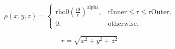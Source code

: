\documentclass[a4paper,14pt]{extarticle}
\begin{document}
\begin{equation*}
\rho(\mathit{x},\mathit{y},\mathit{z}) = \begin{cases}
               \mathrm{rho0} \left(\frac{\mathrm{r0}}{r}\right)^\mathrm{alpha},       &  \mathrm{rInner} \le \mathrm{r} \le  \mathrm{rOuter}, \\
               0,& \text{otherwise},          \end{cases}
\end{equation*}

\begin{equation*}
 r=\sqrt{\mathit{x}^2+\mathit{y}^2+\mathit{z}^2}
\end{equation*}
\end{document}
